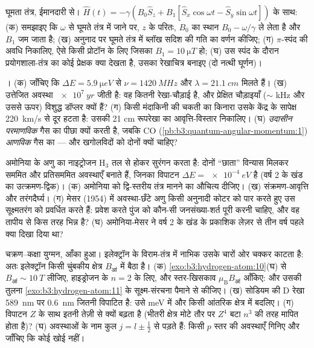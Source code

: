 \begin{exercise}[$\star\star$]\label{exo:b3:spin-two-level:7}
घूमता तंत्र, ईमानदारी से। $\hat H(t) = -\gamma(B_0\hat S_z
+ B_1[\hat S_x\cos\omega t - \hat S_y\sin\omega t])$ के साथ: (क) समझाइए
कि $\omega$ से घूमते तंत्र में जाने पर, $z$ के परितः,
$B_0$ का स्थान $B_0 - \omega/\gamma$ ले लेता है और $B_1$ जम जाता है;
(ख) अनुनाद पर घूमते तंत्र में ब्लॉख सदिश की गति का वर्णन कीजिए; (ग)
$\pi$-स्पंद की अवधि निकालिए, ऐसे किसी प्रोटॉन के लिए जिसका $B_1 =
\qty{10}{\micro T}$ हो; (घ) उस स्पंद के दौरान प्रयोगशाला-तंत्र का कोई प्रेक्षक
क्या देखता है, उसका रेखाचित्र बनाइए (दो नत्थी घूर्णन)।
\end{exercise}

\begin{exercise}[$\star\star$]\label{exo:b3:spin-two-level:8}
। (क) जाँचिए कि $\Delta E = \qty{5.9}{\micro eV}$ से
$\nu = \qty{1420}{MHz}$ और $\lambda = \qty{21.1}{cm}$ मिलते हैं। (ख)
उत्तेजित अवस्था $\qty{e7}{yr}$ जीती है: वह कितनी रेखा-चौड़ाई है, और
प्रेक्षित चौड़ाइयाँ ($\sim$ kHz और उससे ऊपर) विशुद्ध डॉप्लर क्यों हैं? (ग) किसी
मंदाकिनी की चकती का किनारा उसके केंद्र के सापेक्ष \qty{220}{km/s} से
दूर हटता है: उसकी 21 cm रूपरेखा का आवृत्ति-विस्तार निकालिए। (घ)
 \emph{उदासीन परमाणविक} गैस का पीछा क्यों करती है, जबकि CO
(\cref{pb:b3:quantum-angular-momentum:1}) \emph{आणविक}
गैस का --- और खगोलविदों को दोनों क्यों चाहिए?
\end{exercise}

\begin{exercise}[$\star\star$]\label{exo:b3:spin-two-level:9}
अमोनिया के अणु का नाइट्रोजन H$_3$ तल से होकर सुरंगन करता है:
दोनों ``छाता'' विन्यास मिलकर सममित और
प्रतिसममित अवस्थाएँ बनाते हैं, जिनका विपाटन $\Delta E = \qty{e-4}{eV}$ है
(वर्ष 2 के खंड का उत्क्रमण-द्विक)। (क) अमोनिया को द्वि-स्तरीय तंत्र
मानने का औचित्य दीजिए। (ख) संक्रमण-आवृत्ति और
तरंगदैर्घ्य। (ग) मेसर (1954) में अवस्था-छँटे अणु किसी अनुनादी कोटर को
पार करते हुए उस सूक्ष्मतरंग को प्रवर्धित करते हैं: प्रवेश करते पुंज को
कौन-सी जनसंख्या-शर्त पूरी करनी चाहिए, और वह तापीय से किस तरह भिन्न है?
(घ) अमोनिया-मेसर ने वर्ष 2 के खंड के प्रकाशिक लेज़र से तीन वर्ष पहले
क्या दिखा दिया था?
\end{exercise}

\begin{exercise}[$\star\star\star$]\label{exo:b3:spin-two-level:10}
चक्रण--कक्षा युग्मन, आँका हुआ। इलेक्ट्रॉन के विराम-तंत्र में
नाभिक उसके चारों ओर चक्कर काटता है: अतः इलेक्ट्रॉन किसी चुंबकीय क्षेत्र $B_{\text
{आं}}$ में बैठा है। (क) \cref{exo:b3:hydrogen-atom:10}(घ) से
$B_{\text{आं}} \sim \qty{10}{T}$ लीजिए, हाइड्रोजन के $n = 2$ के लिए, और
स्तर-खिसकाव $\mu_{\text{B}}B_{\text{आं}}$ आँकिए: और उसकी तुलना
\cref{exo:b3:hydrogen-atom:11} के सूक्ष्म-संरचना पैमाने से कीजिए। (ख) सोडियम की
D रेखा \qty{589}{nm} पर \qty{0.6}{nm} जितनी विपाटित है: उसे \unit{meV} में
और किसी आंतरिक क्षेत्र में बदलिए। (ग) विपाटन $Z$ के साथ इतनी तेज़ी से
क्यों बढ़ता है (भीतरी क्षेत्र मोटे तौर पर $Z^4$ बटा $n^3$ की तरह मापित होता है)?
(घ) अवस्थाओं के नाम कुल $j = l \pm \tfrac12$ से पड़ते हैं: किसी
$p$ स्तर की अवस्थाएँ गिनिए और जाँचिए कि कोई खोई नहीं।
\end{exercise}

